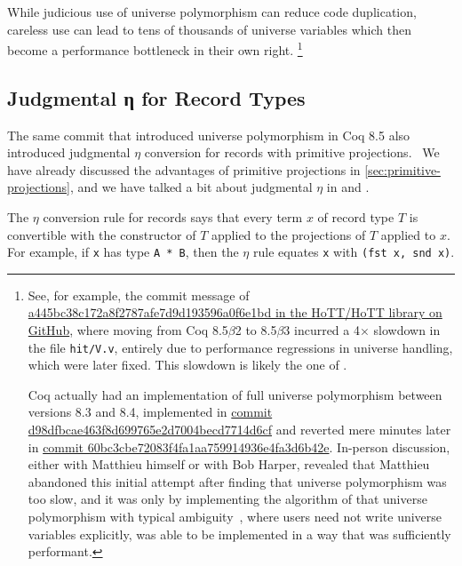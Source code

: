 While judicious use of universe polymorphism can reduce code duplication, careless use can lead to tens of thousands of universe variables which then become a performance bottleneck in their own right.%
\footnote{%
  See, for example, the commit message of \href{https://github.com/HoTT/HoTT/commit/a445bc38c172a8f2787afe7d9d193596a0f6e1bd}{a445bc38c172a8f2787afe7d9d193596a0f6e1bd in the HoTT/HoTT library on GitHub}, where moving from Coq 8.5$\beta$2 to 8.5$\beta$3 incurred a 4$\times$ slowdown in the file \texttt{hit/V.v}, entirely due to performance regressions in universe handling, which were later fixed.
  This slowdown is likely the one of .

  Coq actually had an implementation of full universe polymorphism between versions 8.3 and 8.4, implemented in \href{https://github.com/coq/coq/commit/d98dfbcae463f8d699765e2d7004becd7714d6cf}{commit d98dfbcae463f8d699765e2d7004becd7714d6cf} and reverted mere minutes later in \href{https://github.com/coq/coq/commit/60bc3cbe72083f4fa1aa759914936e4fa3d6b42e}{commit 60bc3cbe72083f4fa1aa759914936e4fa3d6b42e}.
  In-person discussion, either with Matthieu himself or with Bob Harper, revealed that Matthieu abandoned this initial attempt after finding that universe polymorphism was too slow, and it was only by implementing the algorithm of \textcite{Harper1991107} that universe polymorphism with typical ambiguity~\cite{Universe2012Shulman,Typical1966Specker,Harper1991107}, where users need not write universe variables explicitly, was able to be implemented in a way that was sufficiently performant.%
}

\subsection{Judgmental η for Record Types}\label{sec:fixes:theory:record-eta}\label{sec:record-eta}
The same commit that introduced universe polymorphism in Coq 8.5 also introduced judgmental $\eta$ conversion for records with primitive projections.~\cite{coq-commit-polyproj}
We have already discussed the advantages of primitive projections in \autoref{sec:primitive-projections}, and we have talked a bit about judgmental $\eta$ in  and .

The $\eta$ conversion rule for records says that every term $x$ of record type $T$ is convertible with the constructor of $T$ applied to the projections of $T$ applied to $x$.
For example, if \texttt{x} has type \texttt{A * B}, then the $\eta$ rule equates \texttt{x} with \texttt{(fst x, snd x)}.

